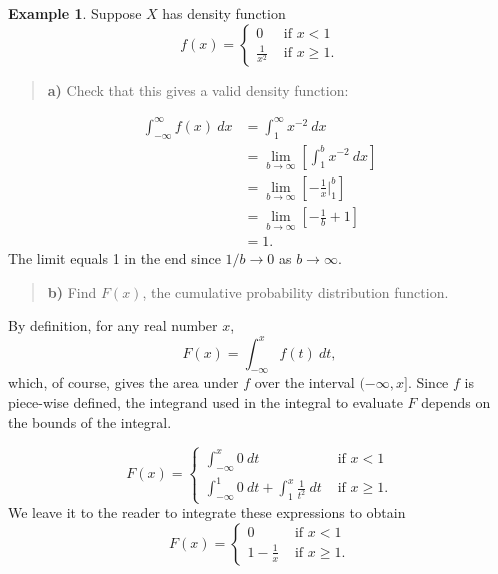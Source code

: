 \documentclass[
]{book}
\theoremstyle{definition}
\theoremstyle{definition}
\newtheorem{example}{Example}[chapter]
\theoremstyle{definition}
\theoremstyle{definition}
\theoremstyle{remark}
\begin{document}
\begin{example}
Suppose \(X\) has density function
\[
f(x)=
\begin{cases}
0 &\text{ if } x < 1 \\
\frac{1}{x^2} &\text{ if } x \geq 1.
\end{cases}
\]

\begin{quote}
\textbf{a)} Check that this gives a valid density function:
\end{quote}

\begin{align*}
 \int_{-\infty}^{\infty} f(x)~dx    &= \int_1^\infty x^{-2}~dx \\
                                    &= \lim_{b \to \infty} \left[\int_1^b x^{-2}~dx \right] \\
                                    &= \lim_{b \to \infty} \left[ -\frac{1}{x} \biggr|_1^b \right]\\
                                    &= \lim_{b \to \infty} \left[ -\frac{1}{b}+1\right]\\
                                    &= 1.
\end{align*}
The limit equals 1 in the end since \(1/b \to 0\) as \(b \to \infty\).

\begin{quote}
\textbf{b)} Find \(F(x)\), the cumulative probability distribution function.
\end{quote}

By definition, for any real number \(x\), \[F(x) = \int_{-\infty}^x f(t)~dt,\] which, of course, gives the area under \(f\) over the interval \((-\infty, x]\). Since \(f\) is piece-wise defined, the integrand used in the integral to evaluate \(F\) depends on the bounds of the integral.

\[
F(x)=
\begin{cases}
\displaystyle\int_{-\infty}^x 0 ~dt &\text{ if } x < 1 \\
\displaystyle\int_{-\infty}^1 0 ~dt  + \displaystyle\int_{1}^x \frac{1}{t^2} ~dt&\text{ if } x \geq 1.
\end{cases}
\]
We leave it to the reader to integrate these expressions to obtain
\[
F(x)=
\begin{cases}
0 &\text{ if } x < 1 \\
\displaystyle 1 - \frac{1}{x} &\text{ if } x \geq 1.
\end{cases}
\]


\end{example}
\end{document}
